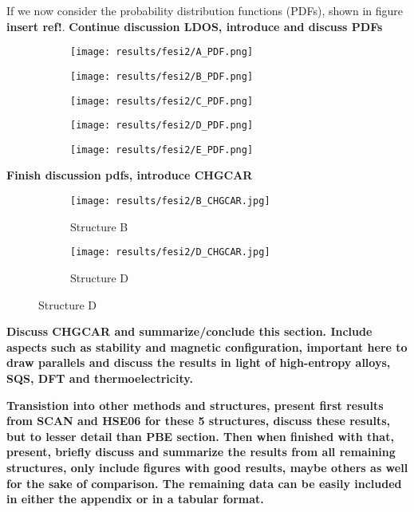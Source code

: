 If we now consider the probability distribution functions (PDFs), shown in figure \textbf{insert ref!}.  
\textbf{Continue discussion LDOS, introduce and discuss PDFs}

\begin{figure}[H]
\centering
	\begin{subfigure}{\textwidth}
		\texttt{[image: results/fesi2/A\_PDF.png]}
	\end{subfigure}	
	\begin{subfigure}{\textwidth}
		\texttt{[image: results/fesi2/B\_PDF.png]}
	\end{subfigure}
	\begin{subfigure}{\textwidth}
		\texttt{[image: results/fesi2/C\_PDF.png]}
	\end{subfigure}
\end{figure}
\begin{figure}[H]
\centering
	\begin{subfigure}{\textwidth}
		\texttt{[image: results/fesi2/D\_PDF.png]}
	\end{subfigure}
	\begin{subfigure}{\textwidth}
		\texttt{[image: results/fesi2/E\_PDF.png]}
	\end{subfigure}
\end{figure}

\textbf{Finish discussion pdfs, introduce CHGCAR}

\begin{figure}
	\begin{subfigure}{\textwidth}
		\texttt{[image: results/fesi2/B\_CHGCAR.jpg]}
		\caption{Structure B}
	\end{subfigure}
	\hfill
	\begin{subfigure}{\textwidth}
		\texttt{[image: results/fesi2/D\_CHGCAR.jpg]}
		\caption{Structure D}
	\end{subfigure}
\end{figure}



\textbf{Discuss CHGCAR and summarize/conclude this section. Include aspects such as stability and magnetic configuration, important here to draw parallels and discuss the results in light of high-entropy alloys, SQS, DFT and thermoelectricity. }

\textbf{Transistion into other methods and structures, present first results from SCAN and HSE06 for these 5 structures, discuss these results, but to lesser detail than PBE section. Then when finished with that, present, briefly discuss and summarize the results from all remaining structures, only include figures with good results, maybe others as well for the sake of comparison. The remaining data can be easily included in either the appendix or in a tabular format. }

